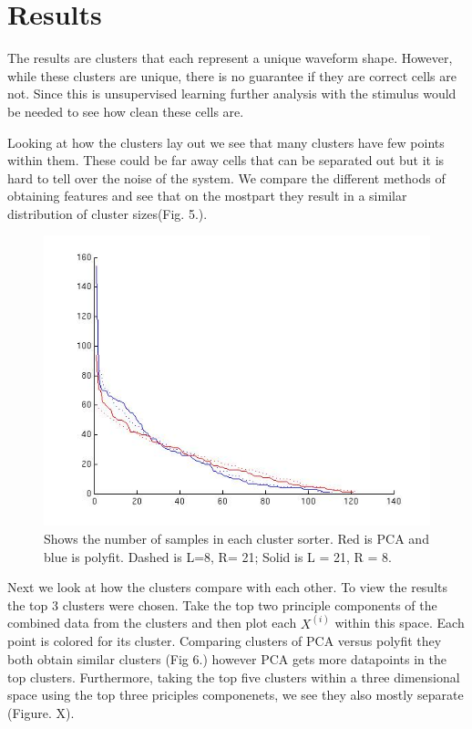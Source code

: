 \documentclass[conference]{IEEEtran}
\begin{document}
\section{Results}

The results are clusters that each represent a unique
waveform shape. However, while these clusters are unique, there is no
guarantee if they are correct cells are not. Since this is
unsupervised learning further analysis with the stimulus would be
needed to see how clean these cells are.

Looking at how the clusters lay out we see that many clusters have few
points within them. These could be far away cells that can be
separated out but it is hard to tell over the noise of the system. We
compare the different methods of obtaining features and see that on
the mostpart they result in a similar distribution of cluster sizes(Fig. 5.).

\begin{figure}
\centering
\includegraphics[width=0.9\linewidth]{traces/clusthistcount.jpg}
\caption{Shows the number of samples in each cluster sorter. Red is
  PCA and blue is polyfit. Dashed is L=8, R= 21; Solid is L = 21, R = 8.}
\end{figure}

Next we look at how the clusters compare with each other.  To view the
results the top 3 clusters were chosen. Take the top two
principle components of the combined data from the clusters and then
plot each $X^{(i)}$ within this space. Each point is colored for its
cluster. Comparing clusters of PCA versus polyfit they both obtain
similar clusters (Fig 6.) however PCA gets more
datapoints in the top clusters. Furthermore, taking the top five
clusters within a three dimensional space using the top three
priciples componenets, we see they also mostly separate (Figure. X).
\end{document}
